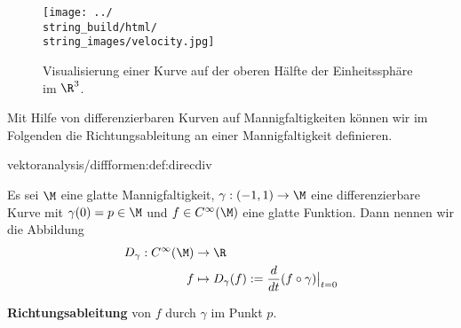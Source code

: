 \documentclass[letterpaper,10pt,english]{jupyterBook}
\begin{document}
\begin{figure}[htbp]
\centering


\noindent\texttt{[image: ../\\string\_build/html/\\string\_images/velocity.jpg]}
\caption{Visualisierung einer Kurve auf der oberen Hälfte der Einheitssphäre im \(\R^3\).}\label{\detokenize{vektoranalysis/diffformen:fig-velocity}}\end{figure}

\par
Mit Hilfe von differenzierbaren Kurven auf Mannigfaltigkeiten können wir im Folgenden die Richtungsableitung an einer Mannigfaltigkeit definieren.
\begin{definition}{}{vektoranalysis/diffformen:def:direcdiv}



\par
Es sei \(\M\) eine glatte Mannigfaltigkeit, \(\gamma:(-1,1)\to\M\) eine differenzierbare Kurve mit \(\gamma(0)=p\in\M\) und \(f \in C^\infty(\M)\) eine glatte Funktion.
Dann nennen wir die Abbildung
\begin{align*}
D_\gamma : C^\infty(\M) &\to \R\\
f &\mapsto D_\gamma(f):=\frac{d}{dt}(f\circ \gamma)\big\rvert_{t=0}
\end{align*}
\par
\textbf{Richtungsableitung} von \(f\) durch \(\gamma\) im Punkt \(p\).
\end{definition}
\end{document}
